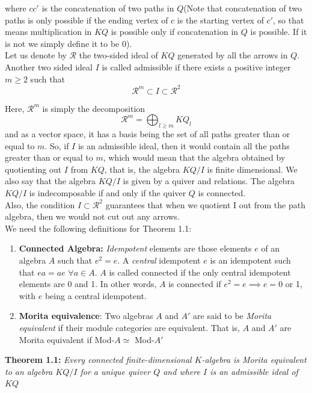\documentclass{amsart}
\numberwithin{figure}{section}
\begin{document}
where $c c'$ is the concatenation of two paths in $Q$(Note that concatenation of two paths is only possible if the ending vertex of $c$ is the starting vertex of $c'$, so that means multiplication in $KQ$ is possible only if concatenation in $Q$ is possible. If it is not we simply define it to be 0). \\


Let us denote by $\mathcal{R}$ the two-sided ideal of $KQ$ generated by all the arrows in $Q$. Another two sided ideal $I$ is called admissible if there exists a positive integer $m\geq 2$ such that 
\[
\mathcal{R}^m \subset I \subset \mathcal{R}^2
\]

Here, $\mathcal{R}^m$ is simply the decomposition $$\mathcal{R}^m=\bigoplus_{l \geq m}KQ_l$$ and as a vector space, it has a basis being the set of all paths greater than or equal to $m$. So, if $I$ is an admissible ideal, then it would contain all the paths greater than or equal to $m$, which would mean that the algebra obtained by quotienting out $I$ from $KQ$, that is, the algebra $KQ/I$ is finite dimensional. We also say that the algebra $KQ/I$ is given by a quiver and relations. The algebra $KQ/I$ is indecomposable if and only if the quiver $Q$ is connected. \\
Also, the condition $I \subset\mathcal{R}^2$ guarantees that when we quotient I out from the path algebra, then we would not cut out any arrows.\\
We need the following definitions for Theorem 1.1: 
\begin{enumerate}
\item \textbf{Connected Algebra: } \textit{Idempotent} elements are those elements $e$ of an algebra $A$ such that $e^2=e$. A \textit{central} idempotent $e$ is an idempotent such that $ea=ae$ $\forall a \in A$. $A$ is called connected if the only central idempotent elements are 0 and 1. In other words, $A$ is connected if $e^2=e\implies e=0$ or 1, with $e$ being a central idempotent.  
\item \textbf{Morita equivalence}: Two algebras $A$ and $A'$ are said to be \textit{Morita equivalent} if their module categories are equivalent. That is, $A$ and $A'$ are Morita equivalent if Mod-$A \simeq$ Mod-$A'$  
\end{enumerate}

 \textbf{Theorem 1.1: } \textit{Every connected finite-dimensional $K$-algebra is Morita equivalent to an algebra $KQ/I$ for a unique quiver $Q$ and where $I$ is an admissible ideal of $KQ$}\\
\end{document}
